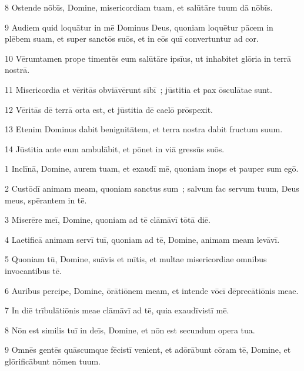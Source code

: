\psalmVerse
  {\phantom{00}8}
  {Ostende nōbīs, Domine, misericordiam tuam, et salūtāre tuum dā nōbīs.}


\psalmVerse
  {\phantom{00}9}
  {Audiem quid loquātur in mē Dominus Deus, quoniam loquētur pācem in plēbem suam, et super sanctōs suōs, et in eōs quī convertuntur ad cor.}


\psalmVerse
  {\phantom{0}10}
  {Vērumtamen prope timentēs eum salūtāre ipsīus, ut inhabitet glōria in terrā nostrā.}


\psalmVerse
  {\phantom{0}11}
  {Misericordia et vēritās obviāvērunt sibī~; jūstitia et pax ōsculātae sunt.}


\psalmVerse
  {\phantom{0}12}
  {Vēritās dē terrā orta est, et jūstitia dē caelō prōspexit.}


\psalmVerse
  {\phantom{0}13}
  {Etenim Dominus dabit benignitātem, et terra nostra dabit fructum suum.}


\psalmVerse
  {\phantom{0}14}
  {Jūstitia ante eum ambulābit, et pōnet in viā gressūs suōs.}




\psalmVerse
  {\phantom{00}1}
  {Inclīnā, Domine, aurem tuam, et exaudī mē, quoniam inops et pauper sum egō.}


\psalmVerse
  {\phantom{00}2}
  {Custōdī animam meam, quoniam sanctus sum~; salvum fac servum tuum, Deus meus, spērantem in tē.}


\psalmVerse
  {\phantom{00}3}
  {Miserēre meī, Domine, quoniam ad tē clāmāvī tōtā diē.}


\psalmVerse
  {\phantom{00}4}
  {Laetificā animam servī tuī, quoniam ad tē, Domine, animam meam levāvī.}


\psalmVerse
  {\phantom{00}5}
  {Quoniam tū, Domine, suāvis et mītis, et multae misericordiae omnibus invocantibus tē.}


\psalmVerse
  {\phantom{00}6}
  {Auribus percipe, Domine, ōrātiōnem meam, et intende vōcī dēprecātiōnis meae.}


\psalmVerse
  {\phantom{00}7}
  {In diē trībulātiōnis meae clāmāvī ad tē, quia exaudīvistī mē.}


\psalmVerse
  {\phantom{00}8}
  {Nōn est similis tuī in deīs, Domine, et nōn est secundum opera tua.}


\psalmVerse
  {\phantom{00}9}
  {Omnēs gentēs quāscumque fēcistī venient, et adōrābunt cōram tē, Domine, et glōrificābunt nōmen tuum.}


